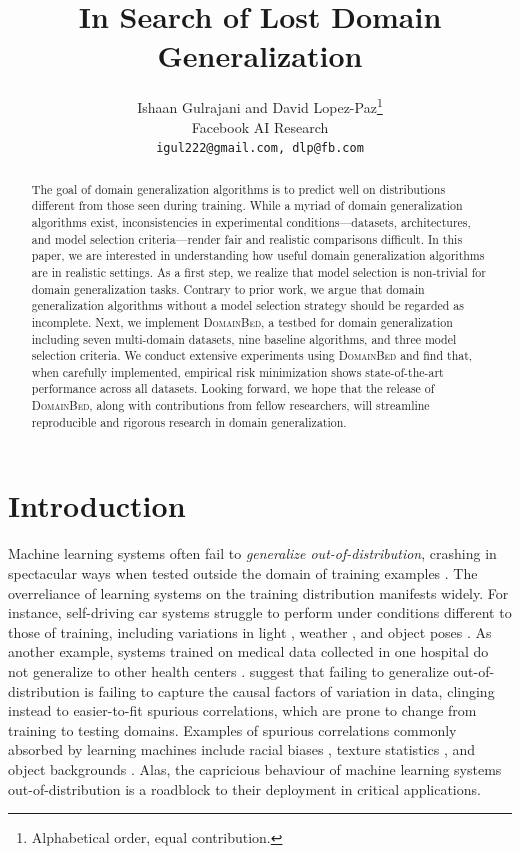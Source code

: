 \documentclass{article}
\title{In Search of Lost Domain Generalization}
\author{%
    Ishaan Gulrajani and David Lopez-Paz\thanks{Alphabetical order, equal contribution.}\\
    Facebook AI Research\\
    \texttt{igul222@gmail.com, dlp@fb.com}
}
\newcommand{\domainbed}{\textsc{DomainBed}\xspace}
\begin{document}
\maketitle

\begin{abstract}
The goal of domain generalization algorithms is to predict well on distributions different from those seen during training.
%
While a myriad of domain generalization algorithms exist, inconsistencies in experimental conditions---datasets, architectures, and model selection criteria---render fair and realistic comparisons difficult.
%
In this paper, we are interested in understanding how useful domain generalization algorithms are in realistic settings.
%
As a first step, we realize that model selection is non-trivial for domain generalization tasks.
%
Contrary to prior work, we argue that domain generalization algorithms without a model selection strategy should be regarded as incomplete.
%
Next, we implement \domainbed, a testbed for domain generalization including seven multi-domain datasets, nine baseline algorithms, and three model selection criteria.
%
We conduct extensive experiments using \domainbed and find that, when carefully implemented, empirical risk minimization shows state-of-the-art performance across all datasets.
%
Looking forward, we hope that the release of \domainbed, along with contributions from fellow researchers, will streamline reproducible and rigorous research in domain generalization.
\end{abstract}

\section{Introduction}

Machine learning systems often fail to \emph{generalize out-of-distribution}, crashing in spectacular ways when tested outside the domain of training examples \citep{torralba2011unbiased}.
%
The overreliance of learning systems on the training distribution manifests widely.
%
For instance, self-driving car systems struggle to perform under conditions different to those of training, including variations in light \citep{dai2018dark}, weather \citep{volk2019towards}, and object poses \citep{alcorn2019strike}.
%
As another example, systems trained on medical data collected in one hospital do not generalize to other health centers \citep{castro2019causality, albadawy2018deep, perone2019unsupervised, mittech}.
%
\citet{arjovsky2019invariant} suggest that failing to generalize out-of-distribution is failing to capture the causal factors of variation in data, clinging instead to easier-to-fit spurious correlations, which are prone to change from training to testing domains.
%
Examples of spurious correlations commonly absorbed by learning machines include racial biases \citep{stock2018convnets}, texture statistics \citep{geirhos2018ImageNet}, and object backgrounds \citep{beery2018recognition}.
%
Alas, the capricious behaviour of machine learning systems out-of-distribution is a roadblock to their deployment in critical applications.
\end{document}
